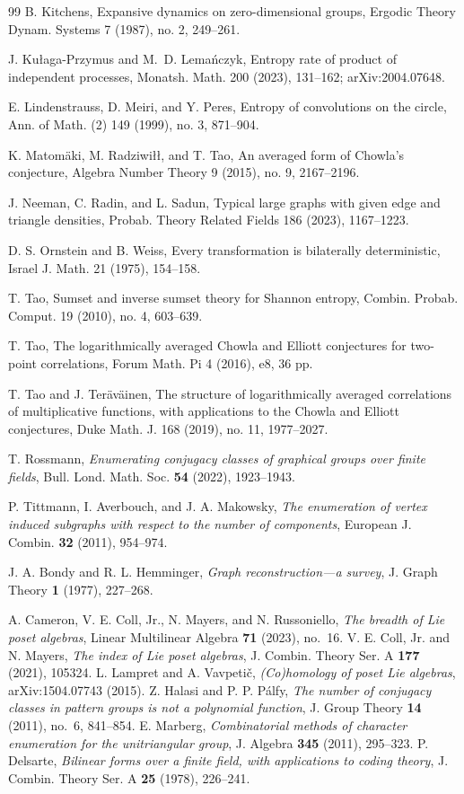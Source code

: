 \documentclass[11pt]{article}
\theoremstyle{definition}
\begin{document}
\begin{thebibliography}{99}
B. Kitchens,
Expansive dynamics on zero-dimensional groups,
Ergodic Theory Dynam. Systems 7 (1987), no. 2, 249--261.

J. Ku\l aga-Przymus and M.~D. Lema\'nczyk,
Entropy rate of product of independent processes,
Monatsh. Math. 200 (2023), 131--162; arXiv:2004.07648.

E. Lindenstrauss, D. Meiri, and Y. Peres,
Entropy of convolutions on the circle,
Ann. of Math. (2) 149 (1999), no. 3, 871--904.

K. Matom\"aki, M. Radziwi\l\l, and T. Tao,
An averaged form of Chowla's conjecture,
Algebra Number Theory 9 (2015), no. 9, 2167--2196.

J. Neeman, C. Radin, and L. Sadun,
Typical large graphs with given edge and triangle densities,
Probab. Theory Related Fields 186 (2023), 1167--1223.


D. S. Ornstein and B. Weiss,
Every transformation is bilaterally deterministic,
Israel J. Math. 21 (1975), 154--158.

T. Tao,
Sumset and inverse sumset theory for Shannon entropy,
Combin. Probab. Comput. 19 (2010), no. 4, 603--639.

T. Tao,
The logarithmically averaged Chowla and Elliott conjectures for
two-point correlations,
Forum Math. Pi 4 (2016), e8, 36 pp.

T. Tao and J. Ter\"av\"ainen,
The structure of logarithmically averaged correlations of
multiplicative functions, with applications to the Chowla and
Elliott conjectures,
Duke Math. J. 168 (2019), no. 11, 1977--2027.

 T. Rossmann, \emph{Enumerating conjugacy classes of graphical groups over finite fields}, Bull. Lond. Math. Soc. \textbf{54} (2022), 1923--1943.

 P. Tittmann, I. Averbouch, and J. A. Makowsky, \emph{The enumeration of vertex induced subgraphs with respect to the number of components}, European J. Combin. \textbf{32} (2011), 954--974.

 J. A. Bondy and R. L. Hemminger, \emph{Graph reconstruction---a survey}, J. Graph Theory \textbf{1} (1977), 227--268.

 A. Cameron, V. E. Coll, Jr., N. Mayers, and N. Russoniello, \emph{The breadth of Lie poset algebras}, Linear Multilinear Algebra \textbf{71} (2023), no.~16.
 V. E. Coll, Jr. and N. Mayers, \emph{The index of Lie poset algebras}, J. Combin. Theory Ser. A \textbf{177} (2021), 105324.
 L. Lampret and A. Vavpeti\v{c}, \emph{(Co)homology of poset Lie algebras}, arXiv:1504.07743 (2015).
 Z. Halasi and P. P. P\'alfy, \emph{The number of conjugacy classes in pattern groups is not a polynomial function}, J. Group Theory \textbf{14} (2011), no.~6, 841--854.
 E. Marberg, \emph{Combinatorial methods of character enumeration for the unitriangular group}, J. Algebra \textbf{345} (2011), 295--323.
 P. Delsarte, \emph{Bilinear forms over a finite field, with applications to coding theory}, J. Combin. Theory Ser. A \textbf{25} (1978), 226--241.


\end{thebibliography}
\end{document}
